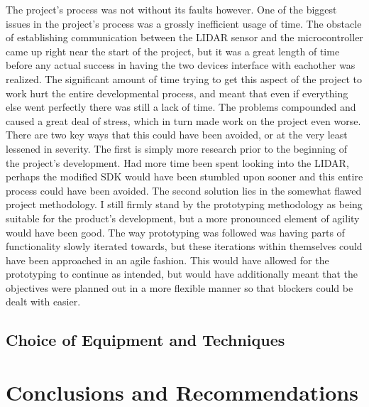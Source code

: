 	The project's process was not without its faults however. One of the biggest issues in the project's process was a grossly inefficient usage of time. The obstacle of establishing communication between the LIDAR sensor and the microcontroller came up right near the start of the project, but it was a great length of time before any actual success in having the two devices interface with eachother was realized. The significant amount of time trying to get this aspect of the project to work hurt the entire developmental process, and meant that even if everything else went perfectly there was still a lack of time. The problems compounded and caused a great deal of stress, which in turn made work on the project even worse. There are two key ways that this could have been avoided, or at the very least lessened in severity. The first is simply more research prior to the beginning of the project's development. Had more time been spent looking into the LIDAR, perhaps the modified SDK would have been stumbled upon sooner and this entire process could have been avoided. The second solution lies in the somewhat flawed project methodology. I still firmly stand by the prototyping methodology as being suitable for the product's development, but a more pronounced element of agility would have been good. The way prototyping was followed was having parts of functionality slowly iterated towards, but these iterations within themselves could have been approached in an agile fashion. This would have allowed for the prototyping to continue as intended, but would have additionally meant that the objectives were planned out in a more flexible manner so that blockers could be dealt with easier.
	
		\section{Choice of Equipment and Techniques}
	
	
	\chapter{Conclusions and Recommendations}